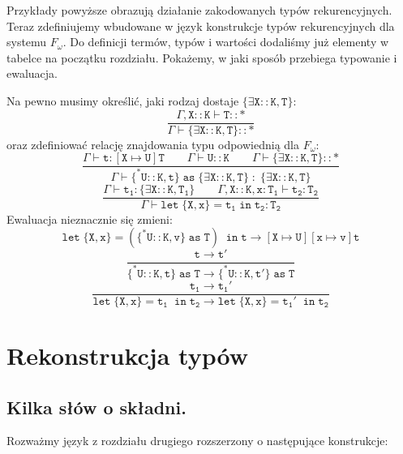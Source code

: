 \documentclass[11pt,leqno]{article}
\begin{document}
\normalsize{
Przykłady powyższe obrazują działanie zakodowanych typów rekurencyjnych. Teraz zdefiniujemy wbudowane w język konstrukcje typów rekurencyjnych dla systemu $F_\omega$. Do definicji termów, typów i wartości dodaliśmy już elementy w tabelce na początku rozdziału. Pokażemy, w jaki sposób przebiega typowanie i ewaluacja. \\
}


Na pewno musimy określić, jaki rodzaj dostaje $\mathtt{\{\exists X::K,T\}}$:
 	\[\mathtt{ \frac{\Gamma,X::K \vdash T::\ast}{\Gamma \vdash \{\exists X::K,T\}::\ast}
		}
	\]
oraz zdefiniować relację znajdowania typu odpowiednią dla $F_\omega$:
 	\[\mathtt{ \frac{\Gamma \vdash t:[X \mapsto U]T\hspace{2em}\Gamma \vdash U::K \hspace{2em}\Gamma \vdash \{\exists X::K,T\}::\ast}{\Gamma \vdash \{^*U::K,t\}\;as\;\{\exists X::K,T\} \; : \; \{\exists X::K,T\}}
		}
	\]
 	\[\mathtt{ \frac{\Gamma \vdash t_1:\{\exists X::K,T_1\}\hspace{2em}\Gamma,X::K,x:T_1 \vdash t_2:T_2}{\Gamma \vdash let\;\{X,x\}=t_1\;in\;t_2:T_2}
		}
	\]
Ewaluacja nieznacznie się zmieni:
 	\[\mathtt{ let\;\{X,x\}=(\{^*U::K,v\}\;as\;T)\;\;in\;t \longrightarrow [X \mapsto U][x \mapsto v]t
		}
	\]
 	\[\mathtt{ \frac{t \longrightarrow t'}{\{^*U::K,t\}\;as\;T \longrightarrow \{^*U::K,t'\}\;as\;T}
		}
	\]
 	\[\mathtt{ \frac{t_1\longrightarrow t_1'}{let\;\{X,x\}=t_1\;\;in\;t_2 \longrightarrow let\;\{X,x\}=t_1'\;\;in\;t_2}
		}
	\]



\section{Rekonstrukcja typów}


\subsection{Kilka słów o składni.}

Rozważmy język z rozdziału drugiego rozszerzony o następujące konstrukcje: \\
\end{document}
